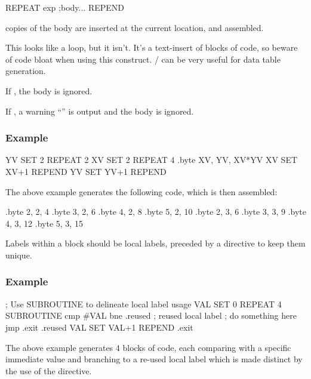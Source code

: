 \begin{usage}
  REPEAT exp
    ;body...
  REPEND
\end{usage}

 copies of the body are inserted at the current location, and assembled.

This looks like a loop, but it isn't. It's a text-insert of  blocks of code, so beware of code bloat when using this construct.  / can be very useful for data table generation.

If , the body is ignored.

If , a warning ``'' is output and the body is ignored.

\subsubsection{Example}

\begin{code}[caption=Data Generation Using Nested Repeat Loops]
YV  SET 2
    REPEAT 2
XV  SET 2
      REPEAT 4
        .byte XV, YV, XV*YV
XV  SET XV+1
      REPEND
YV  SET YV+1
    REPEND
\end{code}

The above example generates the following code, which is then assembled:

\begin{code}
 .byte 2, 2, 4
 .byte 3, 2, 6
 .byte 4, 2, 8
 .byte 5, 2, 10
 .byte 2, 3, 6
 .byte 3, 3, 9
 .byte 4, 3, 12
 .byte 5, 3, 15
\end{code}

Labels within a  block should be local labels, preceded by a
 directive to keep them unique.

\subsubsection{Example}
\begin{code}
; Use SUBROUTINE to delineate local label usage
VAL SET 0
  REPEAT 4
  SUBROUTINE
    cmp #VAL
    bne .reused     ; reused local label
    ; do something here
    jmp .exit
.reused
VAL SET VAL+1
  REPEND    
.exit
\end{code}

The above example generates 4 blocks of code, each comparing with a specific immediate value and branching to a re-used local label which is made distinct by the use of the  directive.

